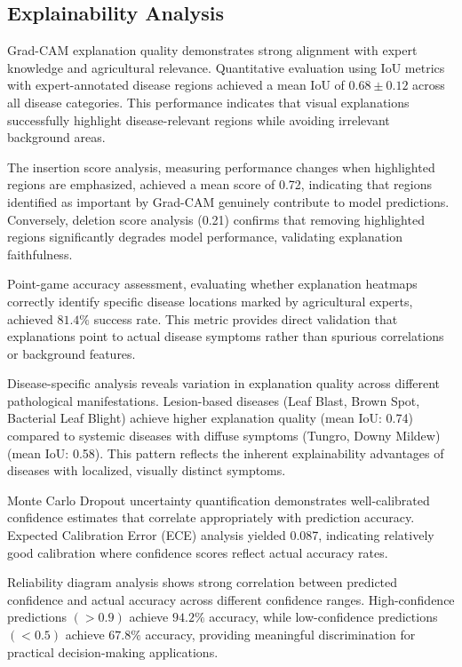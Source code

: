 \documentclass[agriculture,article,submit,pdftex,moreauthors]{Definitions/mdpi}
\begin{document}
\subsection{Explainability Analysis}


Grad-CAM explanation quality demonstrates strong alignment with expert knowledge and agricultural relevance. Quantitative evaluation using IoU metrics with expert-annotated disease regions achieved a mean IoU of $0.68 \pm 0.12$ across all disease categories. This performance indicates that visual explanations successfully highlight disease-relevant regions while avoiding irrelevant background areas.

The insertion score analysis, measuring performance changes when highlighted regions are emphasized, achieved a mean score of 0.72, indicating that regions identified as important by Grad-CAM genuinely contribute to model predictions. Conversely, deletion score analysis (0.21) confirms that removing highlighted regions significantly degrades model performance, validating explanation faithfulness.

Point-game accuracy assessment, evaluating whether explanation heatmaps correctly identify specific disease locations marked by agricultural experts, achieved $81.4\%$ success rate. This metric provides direct validation that explanations point to actual disease symptoms rather than spurious correlations or background features.

Disease-specific analysis reveals variation in explanation quality across different pathological manifestations. Lesion-based diseases (Leaf Blast, Brown Spot, Bacterial Leaf Blight) achieve higher explanation quality (mean IoU: 0.74) compared to systemic diseases with diffuse symptoms (Tungro, Downy Mildew) (mean IoU: 0.58). This pattern reflects the inherent explainability advantages of diseases with localized, visually distinct symptoms.


Monte Carlo Dropout uncertainty quantification demonstrates well-calibrated confidence estimates that correlate appropriately with prediction accuracy. Expected Calibration Error (ECE) analysis yielded 0.087, indicating relatively good calibration where confidence scores reflect actual accuracy rates.

Reliability diagram analysis shows strong correlation between predicted confidence and actual accuracy across different confidence ranges. High-confidence predictions $(>0.9)$ achieve $94.2\%$ accuracy, while low-confidence predictions $(<0.5)$ achieve $67.8\%$ accuracy, providing meaningful discrimination for practical decision-making applications.
\end{document}
